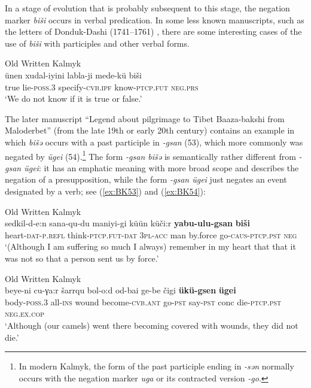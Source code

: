 \documentclass[output=paper]{langsci/langscibook}
\begin{document}
In a stage of evolution that is probably subsequent to this stage, the negation marker \textit{biši} occurs in verbal predication. In some less known manuscripts, such as the letters of Donduk-Dashi (1741–1761) \citep{kokshaeva2011a}, there are some interesting cases of the use of \textit{biši} with participles and other verbal forms.

\ea Old Written Kalmyk \citep[167]{kokshaeva2011a} \label{ex:BK52}\\
	\gll ünen	xudal-iyini	labla-ji			mede-kü			biši\\
	true	lie-\textsc{poss.3}	specify-\textsc{cvb.ipf}	know-\textsc{ptcp.fut}	\textsc{neg.prs}\\
	\glt `We do not know if it is true or false.'
\z


The later manuscript “Legend about pilgrimage to Tibet Baaza-bakshi from Maloderbet” (from the late 19th or early 20th century) contains an example in which \textit{bišǝ} occurs with a past participle in \textit{-gsan} (53), which more commonly was negated by \textit{ügei} (54).\footnote{In modern Kalmyk, the form of the past participle ending in \textit{-sən} normally occurs with the negation marker \textit{uga} or its contracted version \textit{-go}.} The form \textit{-gsan bišǝ} is semantically rather different from \textit{-gsan ügei}: it has an emphatic meaning with more broad scope and describes the negation of a presupposition, while the form \textit{-gsan ügei} just negates an event designated by a verb; see (\ref{ex:BK53}) and (\ref{ex:BK54}):

\ea Old Written Kalmyk \citep[103]{bembeev2004a} \label{ex:BK53}\\
	\gll sedkil-d-e:n		sana-qu-du		maniyi-gi	küün	küči:r	\textbf{yabu-ulu-gsan}	\textbf{biši}\\
	heart-\textsc{dat-p.refl}	think-\textsc{ptcp.fut-dat}	\textsc{3pl-acc} 	man	by.force	go-\textsc{caus-ptcp.pst}	\textsc{neg}\\
	\glt `(Although I am suffering so much I always) remember in my heart that that it was not so that a person sent us by force.'
\z

\ea Old Written Kalmyk \citep[103]{bembeev2004a} \label{ex:BK54}\\
	\gll beye-ni	cu-γa:r	šarrqu	bol-o:d				od-bai	ge-be	čigi	\textbf{ükü-gsen}	\textbf{ügei}\\
	body-\textsc{poss.3} 	all-\textsc{ins}	wound	become-\textsc{cvb.ant} 	go-\textsc{pst} say-\textsc{pst}	conc die-\textsc{ptcp.pst}	\textsc{neg.ex.cop}\\
	\glt `Although (our camels) went there becoming covered with wounds, they did not die.'
\z
\end{document}
